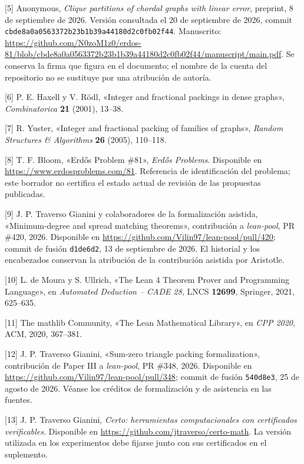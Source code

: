 \documentclass[spanish,11pt,a4paper]{article}
\begin{document}
{[}5{]} Anonymous, \emph{Clique partitions of chordal graphs with linear error}, preprint, 8 de septiembre de 2026. Versión consultada el 20 de septiembre de 2026, commit \nolinkurl{cbde8a0a0563372b23b1b39a44180d2c0fb02f44}. Manuscrito: \url{https://github.com/N0zoM1z0/erdos-81/blob/cbde8a0a0563372b23b1b39a44180d2c0fb02f44/manuscript/main.pdf}. Se conserva la firma que figura en el documento; el nombre de la cuenta del repositorio no se sustituye por una atribución de autoría.

{[}6{]} P. E. Haxell y V. Rödl, «Integer and fractional packings in dense graphs», \emph{Combinatorica} \textbf{21} (2001), 13--38.

{[}7{]} R. Yuster, «Integer and fractional packing of families of graphs», \emph{Random Structures \& Algorithms} \textbf{26} (2005), 110--118.

{[}8{]} T. F. Bloom, «Erdős Problem \#81», \emph{Erdős Problems}. Disponible en \url{https://www.erdosproblems.com/81}. Referencia de identificación del problema; este borrador no certifica el estado actual de revisión de las propuestas publicadas.

{[}9{]} J. P. Traverso Gianini y colaboradores de la formalización asistida, «Minimum-degree and spread matching theorems», contribución a \emph{lean-pool}, PR \#420, 2026. Disponible en \url{https://github.com/Vilin97/lean-pool/pull/420}; commit de fusión \nolinkurl{d1de6d2}, 13 de septiembre de 2026. El historial y los encabezados conservan la atribución de la contribución asistida por Aristotle.

\clearpage
{[}10{]} L. de Moura y S. Ullrich, «The Lean 4 Theorem Prover and Programming Language», en \emph{Automated Deduction -- CADE 28}, LNCS \textbf{12699}, Springer, 2021, 625--635.

{[}11{]} The mathlib Community, «The Lean Mathematical Library», en \emph{CPP 2020}, ACM, 2020, 367--381.

{[}12{]} J. P. Traverso Gianini, «Sum-zero triangle packing formalization», contribución de Paper III a \emph{lean-pool}, PR \#348, 2026. Disponible en \url{https://github.com/Vilin97/lean-pool/pull/348}; commit de fusión \nolinkurl{540d8e3}, 25 de agosto de 2026. Véanse los créditos de formalización y de asistencia en las fuentes.

{[}13{]} J. P. Traverso Gianini, \emph{Certo: herramientas computacionales con certificados verificables}. Disponible en \url{https://github.com/jtraverso/certo-math}. La versión utilizada en los experimentos debe fijarse junto con sus certificados en el suplemento.
\end{document}
